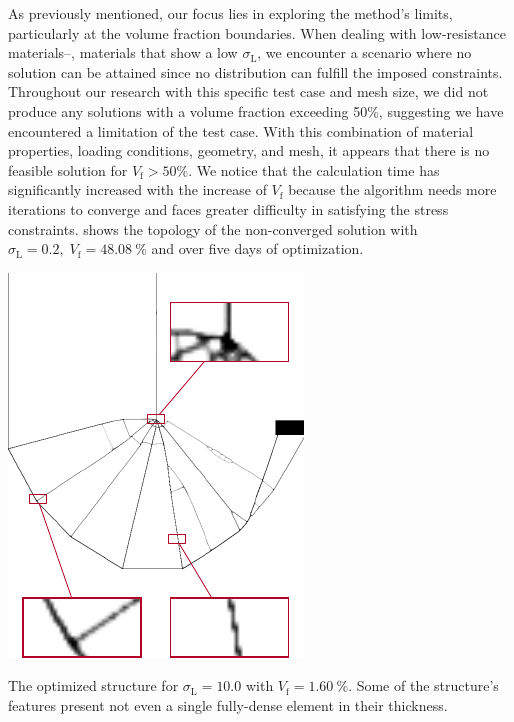 As previously mentioned, our focus lies in exploring the method's limits, particularly at the volume fraction boundaries. When dealing with low-resistance materials--\ie, materials that show a low $\sigma_\text{L}$, we encounter a scenario where no solution can be attained since no distribution can fulfill the imposed constraints. Throughout our research with this specific test case and mesh size, we did not produce any solutions with a volume fraction exceeding 50\%, suggesting we have encountered a limitation of the test case. With this combination of material properties, loading conditions, geometry, and mesh, it appears that there is no feasible solution for $V_\text{f} > 50\%$. We notice that the calculation time has significantly increased with the increase of $V_\text{f}$ because the algorithm needs more iterations to converge and faces greater difficulty in satisfying the stress constraints.  shows the topology of the non-converged solution with $\sigma_\text{L}=0.2, \; V_\text{f}=\qty{48.08}{\percent}$ and over five days of optimization.
\begin{marginfigure}
    \centering
    \includegraphics[width=0.8\linewidth]{figures/03_comparison_TO_TTO/09_to_zoom/to_zoom.pdf}
    \caption{The optimized structure for $\sigma_\text{L}=10.0$ with $V_\text{f}=\qty{1.60}{\percent}$. Some of the structure's features present not even a single fully-dense element in their thickness.}
    \label{fig:03_to_sol_zoom}
\end{marginfigure}

